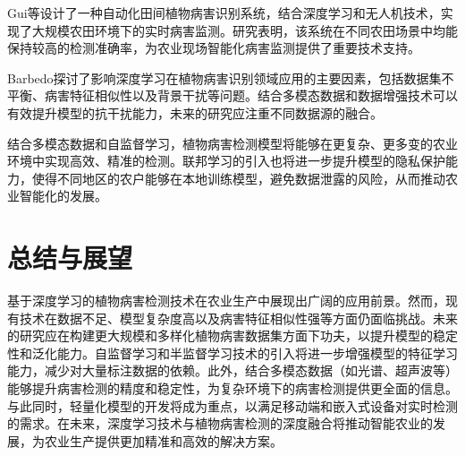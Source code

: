 Gui等\cite{9}设计了一种自动化田间植物病害识别系统，结合深度学习和无人机技术，实现了大规模农田环境下的实时病害监测。研究表明，该系统在不同农田场景中均能保持较高的检测准确率，为农业现场智能化病害监测提供了重要技术支持。

Barbedo探讨了影响深度学习在植物病害识别领域应用的主要因素，包括数据集不平衡、病害特征相似性以及背景干扰等问题。结合多模态数据和数据增强技术可以有效提升模型的抗干扰能力，未来的研究应注重不同数据源的融合\cite{22}。

结合多模态数据和自监督学习，植物病害检测模型将能够在更复杂、更多变的农业环境中实现高效、精准的检测。联邦学习的引入也将进一步提升模型的隐私保护能力，使得不同地区的农户能够在本地训练模型，避免数据泄露的风险，从而推动农业智能化的发展。

\section{总结与展望}
基于深度学习的植物病害检测技术在农业生产中展现出广阔的应用前景。然而，现有技术在数据不足、模型复杂度高以及病害特征相似性强等方面仍面临挑战。未来的研究应在构建更大规模和多样化植物病害数据集方面下功夫，以提升模型的稳定性和泛化能力。自监督学习和半监督学习技术的引入将进一步增强模型的特征学习能力，减少对大量标注数据的依赖。此外，结合多模态数据（如光谱、超声波等）能够提升病害检测的精度和稳定性，为复杂环境下的病害检测提供更全面的信息。与此同时，轻量化模型的开发将成为重点，以满足移动端和嵌入式设备对实时检测的需求。在未来，深度学习技术与植物病害检测的深度融合将推动智能农业的发展，为农业生产提供更加精准和高效的解决方案。